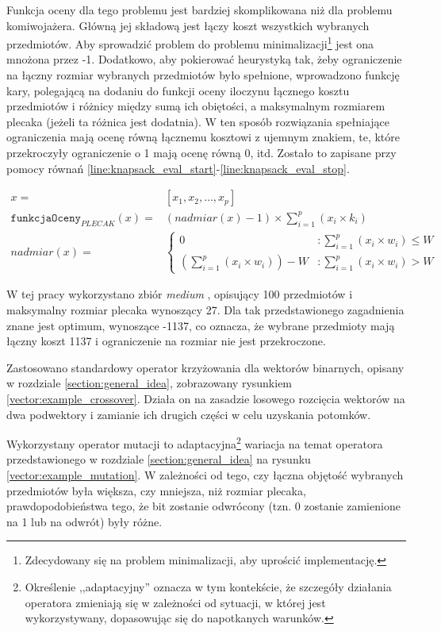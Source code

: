\documentclass[twoside]{iisthesis}
\newcommand{\param}[1]{\mathtt{#1}}
\begin{document}
Funkcja oceny dla tego problemu jest bardziej skomplikowana niż dla problemu komiwojażera. Główną jej składową jest łączy koszt wszystkich wybranych przedmiotów.
Aby sprowadzić problem do problemu minimalizacji\footnote{
	Zdecydowany się na problem minimalizacji, aby uprościć implementację.
} jest ona mnożona przez -1.
Dodatkowo, aby pokierować heurystyką tak, żeby ograniczenie na łączny rozmiar wybranych przedmiotów było spełnione, wprowadzono funkcję kary, polegającą na dodaniu do funkcji oceny iloczynu łącznego kosztu przedmiotów i różnicy między sumą ich obiętości, a maksymalnym rozmiarem plecaka (jeżeli ta różnica jest dodatnia).
W ten sposób rozwiązania spełniające ograniczenia mają ocenę równą łącznemu kosztowi z ujemnym znakiem, te, które przekroczyły ograniczenie o 1 mają ocenę równą 0, itd.
Zostało to zapisane przy pomocy równań \ref{line:knapsack_eval_start}-\ref{line:knapsack_eval_stop}.

\begin{align}
	\label{line:knapsack_eval_start}
	x = &[x_1, x_2, \ldots, x_p] \\
	\param{funkcjaOceny}_{PLECAK}(x) = &(nadmiar(x)-1) \times \sum_{i=1}^{p} (x_i \times k_i) \\
	nadmiar(x) = &\begin{cases}
		0 &: \sum_{i=1}^{p} (x_i \times w_i) \leq W \\
		(\sum_{i=1}^{p} (x_i \times w_i)) - W &: \sum_{i=1}^{p} (x_i \times w_i) > W
	\end{cases}
	\label{line:knapsack_eval_stop}
\end{align}

W tej pracy wykorzystano zbiór \emph{medium} \cite{knapsack_data}, opisujący 100 przedmiotów i maksymalny rozmiar plecaka wynoszący 27.
Dla tak przedstawionego zagadnienia znane jest optimum, wynoszące -1137, co oznacza, że wybrane przedmioty mają łączny koszt 1137 i ograniczenie na rozmiar nie jest przekroczone.

Zastosowano standardowy operator krzyżowania dla wektorów binarnych, opisany w rozdziale \ref{section:general_idea}, zobrazowany rysunkiem \ref{vector:example_crossover}.
Działa on na zasadzie losowego rozcięcia wektorów na dwa podwektory i zamianie ich drugich części w celu uzyskania potomków.

Wykorzystany operator mutacji to adaptacyjna\footnote{
	Określenie ,,adaptacyjny'' oznacza w tym kontekście, że szczegóły działania operatora zmieniają się w zależności od sytuacji, w której jest wykorzystywany, dopasowując się do napotkanych warunków.
} wariacja na temat operatora przedstawionego w rozdziale \ref{section:general_idea} na rysunku \ref{vector:example_mutation}.
W zależności od tego, czy łączna objętość wybranych przedmiotów była większa, czy mniejsza, niż rozmiar plecaka, prawdopodobieństwa tego, że bit zostanie odwrócony (tzn. 0 zostanie zamienione na 1 lub na odwrót) były różne.
\end{document}
